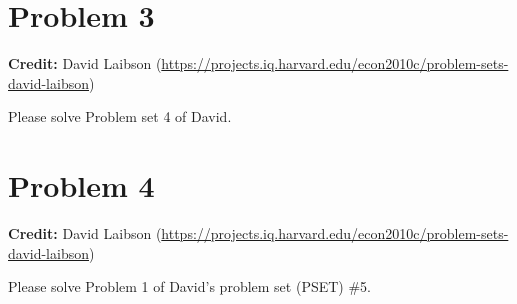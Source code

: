 \documentclass[11pt]{extarticle}
\theoremstyle{plain}
\theoremstyle{definition}
\begin{document}
\vspace{10mm}
\section*{Problem 3} 

\textbf{Credit:} David Laibson (\url{https://projects.iq.harvard.edu/econ2010c/problem-sets-david-laibson})

Please solve Problem set 4 of David.



\vspace{10mm}
\section*{Problem 4} 

\textbf{Credit:} David Laibson (\url{https://projects.iq.harvard.edu/econ2010c/problem-sets-david-laibson})

Please solve Problem 1 of David’s problem set (PSET) \#5.
\end{document}
